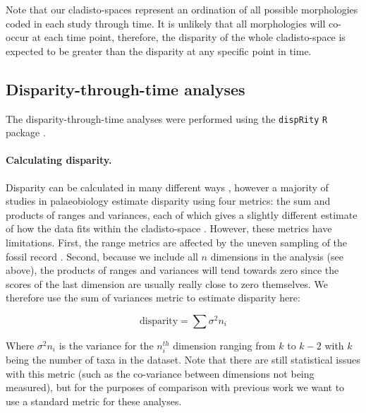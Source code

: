 \documentclass[12pt,a4paper]{article}
\begin{document}
Note that our cladisto-spaces represent an ordination of all possible morphologies coded in each study through time.
It is unlikely that all morphologies will co-occur at each time point, therefore, the disparity of the whole cladisto-space is expected to be greater than the disparity at any specific point in time.

\subsection{Disparity-through-time analyses}

The disparity-through-time analyses were performed using the \texttt{dispRity} \texttt{R} package \citep{dispRity.v02}. %

\paragraph{Calculating disparity.}
\label{disparity_calc}
Disparity can be calculated in many different ways \citep[e.g.][]{Wills1994,Ciampaglio2004,thorneresetting2011,hopkinsdecoupling2013,huang2015origins}, however a majority of studies in palaeobiology estimate disparity using four metrics: the sum and products of ranges and variances, each of which gives a slightly different estimate of how the data fits within the cladisto-space \citep{Foote01071994,Wills1994,brusatte50,Brusatte12092008,cisneros2010,thorneresetting2011,prentice2011,brusattedinosaur2012,toljagictriassic-jurassic2013,ruta2013,bentonmodels2014,bensonfaunal2014}.
However, these metrics have limitations. 
First, the range metrics are affected by the uneven sampling of the fossil record \citep{Butler2012}.
Second, because we include all $n$ dimensions in the analysis (see above), the products of ranges and variances will tend towards zero since the scores of the last dimension are usually really close to zero themselves. 
We therefore use the sum of variances metric to estimate disparity here:

\begin{equation}
\text{disparity} = \sum\sigma^{2}{n_i}
\end{equation}

Where $\sigma^{2}{n_i}$ is the variance for the $n_i^{th}$ dimension ranging from $k$ to $k-2$ with $k$ being the number of taxa in the dataset.
Note that there are still statistical issues with this metric (such as the co-variance between dimensions not being measured), but for the purposes of comparison with previous work we want to use a standard metric for these analyses.
\end{document}
